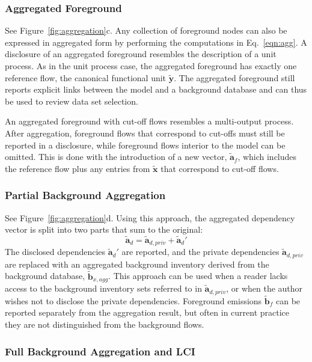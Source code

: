 \subsubsection{Aggregated Foreground}

See Figure~\ref{fig:aggregation}c. Any collection of foreground nodes can also be expressed in aggregated form by performing the computations in Eq.~\ref{eqn:agg}.  A disclosure of an aggregated foreground resembles the description of a unit process.  As in the unit process case, the aggregated foreground has exactly one reference flow, the canonical functional unit $\tilde{\mathbf{y}}$.  The aggregated foreground still reports explicit links between the model and a background database and can thus be used to review data set selection.

An aggregated foreground with cut-off flows resembles a multi-output process.  After aggregation, foreground flows that correspond to cut-offs must still be reported in a disclosure, while foreground flows interior to the model can be omitted.  This is done with the introduction of a new vector, $\tilde{\mathbf{a}}_f$, which includes the reference flow plus any entries from $\tilde{\mathbf{x}}$ that correspond to cut-off flows.  

\subsubsection{Partial Background Aggregation}

See Figure~\ref{fig:aggregation}d.  Using this approach, the
 aggregated dependency vector is split into two parts that sum to the original:
\begin{equation}
 \tilde{\mathbf{a}}_d = \tilde{\mathbf{a}}_{d,priv} + \tilde{\mathbf{a}}_d'
\label{eqn:partial}
\end{equation}
The disclosed dependencies $\tilde{\mathbf{a}}_d'$ are reported, and the private dependencies $\tilde{\mathbf{a}}_{d,priv}$ are replaced with an aggregated background inventory derived from the background database, $\tilde{\mathbf{b}}_{x,agg}$.  This approach can be used when a reader lacks access to the background inventory sets referred to in $\tilde{\mathbf{a}}_{d,priv}$, or when the author wishes not to disclose the private dependencies.  Foreground emissions $\tilde{\mathbf{b}}_f$ can be reported separately from the aggregation result, but often in current practice they are not distinguished from the background flows.  

\subsubsection{Full Background Aggregation and LCI}

